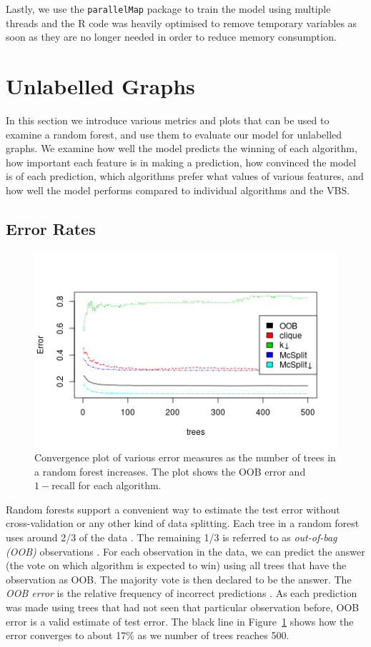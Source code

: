 \documentclass{l4proj}
\theoremstyle{definition}
\theoremstyle{remark}
\begin{document}
Lastly, we use the \texttt{parallelMap} package to train the model using
multiple threads and the R code was heavily optimised to remove temporary
variables as soon as they are no longer needed in order to reduce memory
consumption. 

\section{Unlabelled Graphs}

In this section we introduce various metrics and plots that can be used to
examine a random forest, and use them to evaluate our model for unlabelled
graphs. We examine how well the model predicts the winning of each algorithm,
how important each feature is in making a prediction, how convinced the model is
of each prediction, which algorithms prefer what values of various features, and
how well the model performs compared to individual algorithms and the VBS.

\subsection{Error Rates} \label{sec:unlabelled_error_rates}

\begin{figure}
  \centering
  \includegraphics[scale=0.5]{images/unlabelled_forest_errors.png}
  \caption{Convergence plot of various error measures as the number of trees in
    a random forest increases. The plot shows the OOB error and $1 -
    \text{recall}$ for each algorithm.}
  \label{fig:unlabelled_forest_errors}
\end{figure}

Random forests support a convenient way to estimate the test error without
cross-validation or any other kind of data splitting. Each tree in a random
forest uses around 2/3 of the data \cite{James:2014:ISL:2517747}. The remaining
1/3 is referred to as \emph{out-of-bag (OOB)} observations . For each
observation in the data, we can predict the answer (the vote on which algorithm
is expected to win) using all trees that have the observation as OOB. The
majority vote is then declared to be the answer. The \emph{OOB error} is
the relative frequency of incorrect predictions \cite{James:2014:ISL:2517747}.
As each prediction was made using trees that had not seen that particular
observation before, OOB error is a valid estimate of test error. The black line
in Figure~\ref{fig:unlabelled_forest_errors} shows how the error converges to
about 17\% as we number of trees reaches 500.
\end{document}
